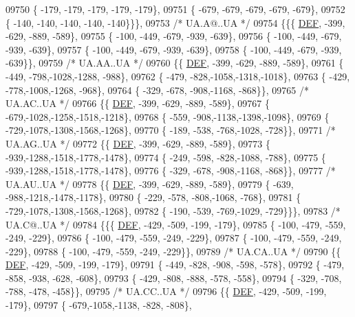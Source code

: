 \begin{DoxyCode}
09750 \{ -179, -179, -179, -179, -179\},
09751 \{ -679, -679, -679, -679, -679\},
09752 \{ -140, -140, -140, -140, -140\}\}\},
09753 \textcolor{comment}{/* UA.A@..UA */}
09754 \{\{\{  \mbox{\hyperlink{1_88_84__epars_8h_a397419fc12b37ed479c8abb9d444d843}{DEF}}, -399, -629, -889, -589\},
09755 \{ -100, -449, -679, -939, -639\},
09756 \{ -100, -449, -679, -939, -639\},
09757 \{ -100, -449, -679, -939, -639\},
09758 \{ -100, -449, -679, -939, -639\}\},
09759 \textcolor{comment}{/* UA.AA..UA */}
09760 \{\{  \mbox{\hyperlink{1_88_84__epars_8h_a397419fc12b37ed479c8abb9d444d843}{DEF}}, -399, -629, -889, -589\},
09761 \{ -449, -798,-1028,-1288, -988\},
09762 \{ -479, -828,-1058,-1318,-1018\},
09763 \{ -429, -778,-1008,-1268, -968\},
09764 \{ -329, -678, -908,-1168, -868\}\},
09765 \textcolor{comment}{/* UA.AC..UA */}
09766 \{\{  \mbox{\hyperlink{1_88_84__epars_8h_a397419fc12b37ed479c8abb9d444d843}{DEF}}, -399, -629, -889, -589\},
09767 \{ -679,-1028,-1258,-1518,-1218\},
09768 \{ -559, -908,-1138,-1398,-1098\},
09769 \{ -729,-1078,-1308,-1568,-1268\},
09770 \{ -189, -538, -768,-1028, -728\}\},
09771 \textcolor{comment}{/* UA.AG..UA */}
09772 \{\{  \mbox{\hyperlink{1_88_84__epars_8h_a397419fc12b37ed479c8abb9d444d843}{DEF}}, -399, -629, -889, -589\},
09773 \{ -939,-1288,-1518,-1778,-1478\},
09774 \{ -249, -598, -828,-1088, -788\},
09775 \{ -939,-1288,-1518,-1778,-1478\},
09776 \{ -329, -678, -908,-1168, -868\}\},
09777 \textcolor{comment}{/* UA.AU..UA */}
09778 \{\{  \mbox{\hyperlink{1_88_84__epars_8h_a397419fc12b37ed479c8abb9d444d843}{DEF}}, -399, -629, -889, -589\},
09779 \{ -639, -988,-1218,-1478,-1178\},
09780 \{ -229, -578, -808,-1068, -768\},
09781 \{ -729,-1078,-1308,-1568,-1268\},
09782 \{ -190, -539, -769,-1029, -729\}\}\},
09783 \textcolor{comment}{/* UA.C@..UA */}
09784 \{\{\{  \mbox{\hyperlink{1_88_84__epars_8h_a397419fc12b37ed479c8abb9d444d843}{DEF}}, -429, -509, -199, -179\},
09785 \{ -100, -479, -559, -249, -229\},
09786 \{ -100, -479, -559, -249, -229\},
09787 \{ -100, -479, -559, -249, -229\},
09788 \{ -100, -479, -559, -249, -229\}\},
09789 \textcolor{comment}{/* UA.CA..UA */}
09790 \{\{  \mbox{\hyperlink{1_88_84__epars_8h_a397419fc12b37ed479c8abb9d444d843}{DEF}}, -429, -509, -199, -179\},
09791 \{ -449, -828, -908, -598, -578\},
09792 \{ -479, -858, -938, -628, -608\},
09793 \{ -429, -808, -888, -578, -558\},
09794 \{ -329, -708, -788, -478, -458\}\},
09795 \textcolor{comment}{/* UA.CC..UA */}
09796 \{\{  \mbox{\hyperlink{1_88_84__epars_8h_a397419fc12b37ed479c8abb9d444d843}{DEF}}, -429, -509, -199, -179\},
09797 \{ -679,-1058,-1138, -828, -808\},

\end{DoxyCode}
